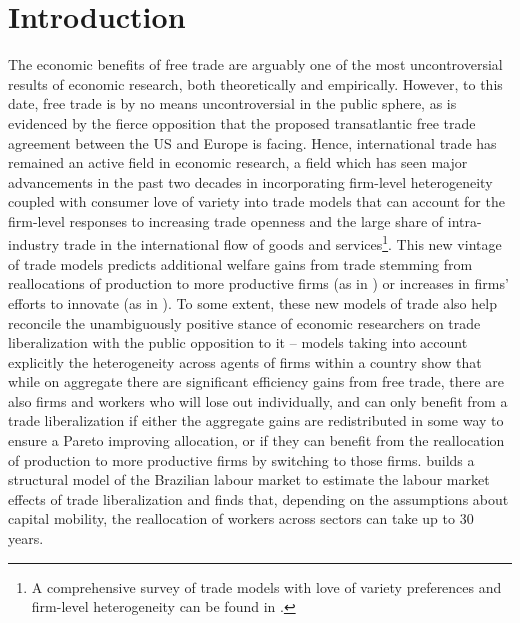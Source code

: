 \section{Introduction}
The economic benefits of free trade are arguably one of the most uncontroversial results of economic research, both theoretically and empirically. However, to this date, free trade is by no means uncontroversial in the public sphere, as is evidenced by the fierce opposition that the proposed transatlantic free trade agreement between the US and Europe is facing. Hence, international trade has remained an active field in economic research, a field which has seen major advancements in the past two decades in incorporating firm-level heterogeneity coupled with consumer love of variety into trade models that can account for the firm-level responses to increasing trade openness and the large share of intra-industry trade in the international flow of goods and services\footnote{A comprehensive survey of trade models with love of variety preferences and firm-level heterogeneity can be found in \citet*{MelitzTrefler2012}.}. This new vintage of trade models predicts additional welfare gains from trade stemming from reallocations of production to more productive firms (as in \citealp{Melitz2003}) or increases in firms' efforts to innovate (as in \citealp{GrossmanHelpman1990}). To some extent, these new models of trade also help reconcile the unambiguously positive stance of economic researchers on trade liberalization with the public opposition to it -- models taking into account explicitly the heterogeneity across agents of firms within a country show that while on aggregate there are significant efficiency gains from free trade, there are also firms and workers who will lose out individually, and can only benefit from a trade liberalization if either the aggregate gains are redistributed in some way to ensure a Pareto improving allocation, or if they can benefit from the reallocation of production to more productive firms by switching to those firms. \citet{DixCarneiro2014} builds a structural model of the Brazilian labour market to estimate the labour market effects of trade liberalization and finds that, depending on the assumptions about capital mobility, the reallocation of workers across sectors can take up to 30 years. \\
